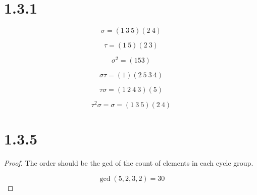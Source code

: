 \documentclass[11pt]{article}
\begin{document}
\section*{1.3.1}

$$
\sigma = (1\ 3\ 5) (2\ 4)
$$

$$
\tau = (1\ 5)(2\ 3)
$$

$$
\sigma^2 = (1 5 3)
$$

$$
\sigma \tau = (1)(2\ 5\ 3\ 4)
$$

$$
\tau \sigma = (1\ 2\ 4\ 3) (5)
$$

$$
\tau^2 \sigma = \sigma = (1\ 3\ 5) (2\ 4)
$$

\section*{1.3.5}

\begin{proof}
	The order should be the gcd of the count of elements in each cycle group.

	$$
	\operatorname{gcd}(5,2,3,2) = 30
	$$

\end{proof}
\end{document}
